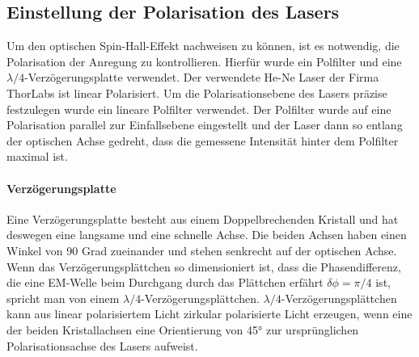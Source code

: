 \documentclass{article}
\begin{document}
\subsection{Einstellung der Polarisation des Lasers}
	Um den optischen Spin-Hall-Effekt nachweisen zu können, ist es notwendig, die Polarisation der Anregung zu kontrollieren. Hierfür wurde ein Polfilter und eine $\lambda /4$-Verzögerungsplatte verwendet. Der verwendete He-Ne Laser der Firma ThorLabs ist linear Polarisiert. Um die Polarisationsebene des Lasers präzise festzulegen wurde ein lineare Polfilter verwendet. Der Polfilter wurde auf eine Polarisation parallel zur Einfallsebene eingestellt und der Laser dann so entlang der optischen Achse gedreht, dass die gemessene Intensität hinter dem Polfilter maximal ist. 
	\paragraph{Verzögerungsplatte}
		Eine Verzögerungsplatte besteht aus einem Doppelbrechenden Kristall und hat deswegen eine langsame und eine schnelle Achse. Die beiden Achsen haben einen Winkel von 90 Grad zueinander und stehen senkrecht auf der optischen Achse. Wenn das Verzögerungsplättchen so dimensioniert ist, dass die Phasendifferenz, die eine EM-Welle beim Durchgang durch das Plättchen erfährt $\delta \phi = \pi /4 $ ist, spricht man von einem  $\lambda /4$-Verzögerungsplättchen. $\lambda /4$-Verzögerungsplättchen kann aus linear polarisiertem Licht zirkular polarisierte Licht erzeugen, wenn eine der beiden Kristallachsen eine Orientierung von 45° zur ursprünglichen Polarisationsachse des Lasers aufweist.
\end{document}
